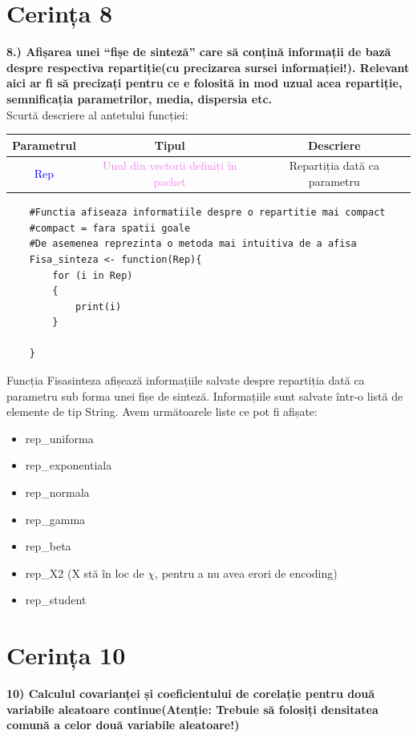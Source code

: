 \documentclass[12pt]{article}
\begin{document}
	\section{Cerința 8}
\textbf{8.) Afișarea unei “fișe de sinteză” care să conțină informații de bază despre respectiva
	repartiție(cu precizarea sursei informației!). Relevant aici ar fi să precizați pentru ce e
	folosită in mod uzual acea repartiție, semnificația parametrilor, media, dispersia etc.}\vspace{5mm}\\
\indent Scurtă descriere al antetului funcției: \\
\begin{center}
	\begin{tabular}{|| c | c | c ||}
		\hline
		Parametrul & Tipul & Descriere \\
		\hline
		\textcolor{blue}{Rep}	 & \textcolor{violet}{Unul din vectorii definiți în pachet} & Repartiția dată ca parametru \\
		\hline
	\end{tabular}
\end{center}	
\begin{lstlisting}
	#Functia afiseaza informatiile despre o repartitie mai compact
	#compact = fara spatii goale
	#De asemenea reprezinta o metoda mai intuitiva de a afisa
	Fisa_sinteza <- function(Rep){
		for (i in Rep)
		{
			print(i)
		}
		
	}
\end{lstlisting}


Funcția Fisa\underline{\hspace{.08in}}sinteza afișează informațiile salvate despre repartiția dată ca parametru sub forma unei fișe de sinteză.\hfill \break
\indent Informațiile sunt salvate într-o listă de elemente de tip String. Avem următoarele liste ce pot fi afișate:
\begin{itemize}
	\item rep\_uniforma
	\item rep\_exponentiala
	\item rep\_normala
	\item rep\_gamma
	\item rep\_beta
	\item rep\_X2 (X stă în loc de $\chi$, pentru a nu avea erori de encoding)
	\item rep\_student
\end{itemize} \pagebreak

	\section{Cerința 10}
\textbf{10) Calculul covarianței și coeficientului de corelație pentru două variabile aleatoare
	continue(Atenție: Trebuie să folosiți densitatea comună a celor două variabile
	aleatoare!)
}\vspace{5mm}
\end{document}
